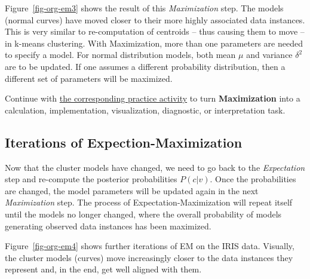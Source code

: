 \documentclass[
  letterpaper,
]{scrbook}
\begin{document}
Figure~\ref{fig-org-em3} shows the result of this \emph{Maximization}
step. The models (normal curves) have moved closer to their more highly
associated data instances. This is very similar to re-computation of
centroids -- thus causing them to move -- in k-means clustering. With
Maximization, more than one parameters are needed to specify a model.
For normal distribution models, both mean \(\mu\) and variance
\(\delta^2\) are to be updated. If one assumes a different probability
distribution, then a different set of parameters will be maximized.

\begin{tcolorbox}[enhanced jigsaw, arc=.35mm, bottomrule=.15mm, bottomtitle=1mm, breakable, colback=white, colbacktitle=quarto-callout-tip-color!10!white, colframe=quarto-callout-tip-color-frame, coltitle=black, left=2mm, leftrule=.75mm, opacityback=0, opacitybacktitle=0.6, rightrule=.15mm, title=\textcolor{quarto-callout-tip-color}{\faLightbulb}\hspace{0.5em}{Put it into practice}, titlerule=0mm, toprule=.15mm, toptitle=1mm]

Continue with \hyperref[sec-pr-10-maximization]{the corresponding
practice activity} to turn \textbf{Maximization} into a calculation,
implementation, visualization, diagnostic, or interpretation task.

\end{tcolorbox}

\subsection{Iterations of
Expection-Maximization}\label{iterations-of-expection-maximization}

Now that the cluster models have changed, we need to go back to the
\emph{Expectation} step and re-compute the posterior probabilities
\(P(c|v)\). Once the probabilities are changed, the model parameters
will be updated again in the next \emph{Maximization} step. The process
of Expectation-Maximization will repeat itself until the models no
longer changed, where the overall probability of models generating
observed data instances has been maximized.

Figure~\ref{fig-org-em4} shows further iterations of EM on the IRIS
data. Visually, the cluster models (curves) move increasingly closer to
the data instances they represent and, in the end, get well aligned with
them.
\end{document}
